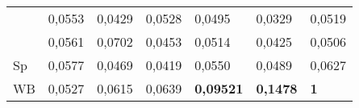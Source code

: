 \begin{table*}
\begin{center}
\begin{tabular}{|l|l|l|l|l|l|l|}
\hspace*{4mm}{\bf K}&0,0553&0,0429&0,0528&0,0495&0,0329&0,0519\\
\hspace*{4mm}{\bf S}&0,0561&0,0702&0,0453&0,0514&0,0425&0,0506\\
\hspace*{4mm}Sp&0,0577&0,0469&0,0419&0,0550&0,0489&0,0627\\
\hspace*{4mm}WB&0,0527&0,0615&0,0639&{\bf 0,09521}&{\bf 0,1478}&{\bf 1}\\
\hline
\end{tabular}
\end{center}
\vspace*{-6pt}
\end{table*}

